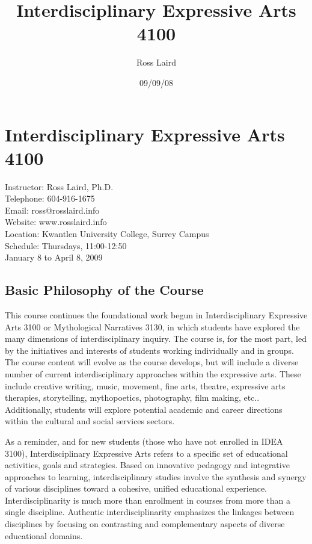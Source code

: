 \documentclass{report}
\author{Ross Laird}
\date{09/09/08}
\title{Interdisciplinary Expressive Arts 4100}
\begin{document}
\section{Interdisciplinary Expressive Arts 4100}
Instructor: Ross Laird, Ph.D.\\ 
Telephone: 604-916-1675\\
Email: ross@rosslaird.info\\
Website: www.rosslaird.info\\
Location: Kwantlen University College, Surrey Campus\\
Schedule: Thursdays, 11:00-12:50\\
January 8 to April 8, 2009\\

\subsection{Basic Philosophy of the Course}

This course continues the foundational work begun in Interdisciplinary Expressive Arts 3100 or Mythological Narratives 3130, in which students have explored the many dimensions of interdisciplinary inquiry. The course is, for the most part, led by the initiatives and interests of students working individually and in groups. The course content will evolve as the course develops, but will include a diverse number of current interdisciplinary approaches within the expressive arts. These include creative writing, music, movement, fine arts, theatre, expressive arts therapies, storytelling, mythopoetics, photography, film making, etc.. Additionally, students will explore potential academic and career directions within the cultural and social services sectors.

As a reminder, and for new students (those who have not enrolled in IDEA 3100), Interdisciplinary Expressive Arts refers to a specific set of educational activities, goals and strategies. Based on innovative
pedagogy and integrative approaches to learning, interdisciplinary
studies involve the synthesis and synergy of various disciplines
toward a cohesive, unified educational experience. Interdisciplinarity
is much more than enrollment in courses from more than a single
discipline. Authentic interdisciplinarity emphasizes the linkages
between disciplines by focusing on contrasting and complementary
aspects of diverse educational domains.
\end{document}
